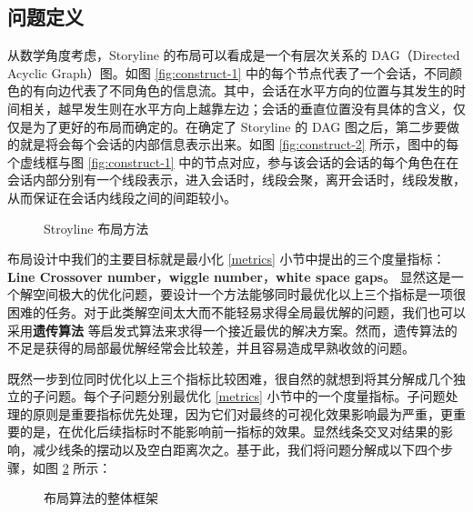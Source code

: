 \subsection{问题定义}
\label{section:problem-definition}
 从数学角度考虑，Storyline 的布局可以看成是一个有层次关系的 DAG（Directed Acyclic Graph）图。如图 \ref{fig:construct-1} 中的每个节点代表了一个会话，不同颜色的有向边代表了不同角色的信息流。其中，会话在水平方向的位置与其发生的时间相关，越早发生则在水平方向上越靠左边；会话的垂直位置没有具体的含义，仅仅是为了更好的布局而确定的。在确定了 Storyline 的 DAG 图之后，第二步要做的就是将会每个会话的内部信息表示出来。如图 \ref{fig:construct-2} 所示，图中的每个虚线框与图 \ref{fig:construct-1} 中的节点对应，参与该会话的会话的每个角色在在会话内部分别有一个线段表示，进入会话时，线段会聚，离开会话时，线段发散，从而保证在会话内线段之间的间距较小。
\begin{figure}[htb]
    \centering
    \caption{Stroyline 布局方法}
    \label{fig:Storyline-dag}
\end{figure}

布局设计中我们的主要目标就是最小化 \ref{metrics} 小节中提出的三个度量指标：\textbf{Line Crossover number}，\textbf{wiggle number}，\textbf{white space gaps}。 显然这是一个解空间极大的优化问题，要设计一个方法能够同时最优化以上三个指标是一项很困难的任务。对于此类解空间太大而不能轻易求得全局最优解的问题，我们也可以采用\textbf{遗传算法}\cite{tanahashi2012design} 等启发式算法来求得一个接近最优的解决方案。然而，遗传算法的不足是获得的局部最优解经常会比较差，并且容易造成早熟收敛的问题。

既然一步到位同时优化以上三个指标比较困难，很自然的就想到将其分解成几个独立的子问题。每个子问题分别最优化 \ref{metrics} 小节中的一个度量指标。子问题处理的原则是重要指标优先处理，因为它们对最终的可视化效果影响最为严重，更重要的是，在优化后续指标时不能影响前一指标的效果。显然线条交叉对结果的影响，减少线条的摆动以及空白距离次之。基于此，我们将问题分解成以下四个步骤，如图 \ref{fig:layout-steps} 所示：
\begin{figure}[htb]
    \centering
    \caption{布局算法的整体框架}
    \label{fig:layout-steps}
\end{figure}


